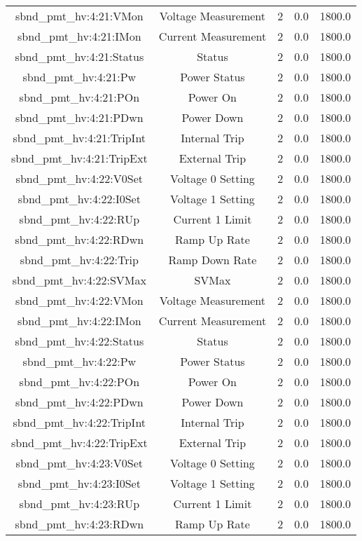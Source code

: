 \begin{center}
\begin{longtable}{c | c c c c }
sbnd\_pmt\_hv:4:21:VMon & Voltage Measurement & 2 & 0.0 & 1800.0\\ 
sbnd\_pmt\_hv:4:21:IMon & Current Measurement & 2 & 0.0 & 1800.0\\ 
sbnd\_pmt\_hv:4:21:Status & Status & 2 & 0.0 & 1800.0\\ 
sbnd\_pmt\_hv:4:21:Pw & Power Status & 2 & 0.0 & 1800.0\\ 
sbnd\_pmt\_hv:4:21:POn & Power On & 2 & 0.0 & 1800.0\\ 
sbnd\_pmt\_hv:4:21:PDwn & Power Down & 2 & 0.0 & 1800.0\\ 
sbnd\_pmt\_hv:4:21:TripInt & Internal Trip & 2 & 0.0 & 1800.0\\ 
sbnd\_pmt\_hv:4:21:TripExt & External Trip & 2 & 0.0 & 1800.0\\ 
sbnd\_pmt\_hv:4:22:V0Set & Voltage 0 Setting & 2 & 0.0 & 1800.0\\ 
sbnd\_pmt\_hv:4:22:I0Set & Voltage 1 Setting & 2 & 0.0 & 1800.0\\ 
sbnd\_pmt\_hv:4:22:RUp & Current 1 Limit & 2 & 0.0 & 1800.0\\ 
sbnd\_pmt\_hv:4:22:RDwn & Ramp Up Rate & 2 & 0.0 & 1800.0\\ 
sbnd\_pmt\_hv:4:22:Trip & Ramp Down Rate & 2 & 0.0 & 1800.0\\ 
sbnd\_pmt\_hv:4:22:SVMax & SVMax & 2 & 0.0 & 1800.0\\ 
sbnd\_pmt\_hv:4:22:VMon & Voltage Measurement & 2 & 0.0 & 1800.0\\ 
sbnd\_pmt\_hv:4:22:IMon & Current Measurement & 2 & 0.0 & 1800.0\\ 
sbnd\_pmt\_hv:4:22:Status & Status & 2 & 0.0 & 1800.0\\ 
sbnd\_pmt\_hv:4:22:Pw & Power Status & 2 & 0.0 & 1800.0\\ 
sbnd\_pmt\_hv:4:22:POn & Power On & 2 & 0.0 & 1800.0\\ 
sbnd\_pmt\_hv:4:22:PDwn & Power Down & 2 & 0.0 & 1800.0\\ 
sbnd\_pmt\_hv:4:22:TripInt & Internal Trip & 2 & 0.0 & 1800.0\\ 
sbnd\_pmt\_hv:4:22:TripExt & External Trip & 2 & 0.0 & 1800.0\\ 
sbnd\_pmt\_hv:4:23:V0Set & Voltage 0 Setting & 2 & 0.0 & 1800.0\\ 
sbnd\_pmt\_hv:4:23:I0Set & Voltage 1 Setting & 2 & 0.0 & 1800.0\\ 
sbnd\_pmt\_hv:4:23:RUp & Current 1 Limit & 2 & 0.0 & 1800.0\\ 
sbnd\_pmt\_hv:4:23:RDwn & Ramp Up Rate & 2 & 0.0 & 1800.0\\ 

\end{longtable}
\end{center}
